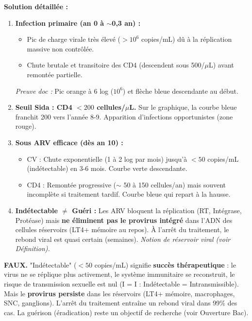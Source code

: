 \documentclass[11pt]{article}
\begin{document}
\begin{exoresolu}
\tcblower
\textbf{Solution détaillée :}
\begin{enumerate}
\item \textbf{Infection primaire (an 0 à $\sim$0,3 an) :} 
    \begin{itemize}
    \item Pic de charge virale très élevé ($> 10^6$ copies/mL) dû à la réplication massive non contrôlée.
    \item Chute brutale et transitoire des CD4 (descendent sous 500/$\mu$L) avant remontée partielle.
    \end{itemize}
    \textit{Preuve doc :} Pic orange à 6 log ($10^6$) et flèche bleue descendante au début.
\item \textbf{Seuil Sida : CD4 $< 200$ cellules/$\mu$L.} Sur le graphique, la courbe bleue franchit 200 vers l'année 8-9. Apparition d'infections opportunistes (zone rouge).
\item \textbf{Sous ARV efficace (dès an 10) :}
    \begin{itemize}
    \item CV : Chute exponentielle (1 à 2 log par mois) jusqu'à $< 50$ copies/mL (indétectable) en 3-6 mois. Courbe verte descendante.
    \item CD4 : Remontée progressive ($\sim$ 50 à 150 cellules/an) mais souvent incomplète si traitement tardif. Courbe bleue qui repart à la hausse.
    \end{itemize}
\item \textbf{Indétectable $\neq$ Guéri :} Les ARV bloquent la réplication (RT, Intégrase, Protéase) mais \textbf{ne éliminent pas le provirus intégré} dans l'ADN des cellules réservoirs (LT4+ mémoire au repos). À l'arrêt du traitement, le rebond viral est quasi certain (semaines). \textit{Notion de réservoir viral (voir Définition).}
\end{enumerate}
\end{exoresolu}

\begin{attention}[Piège BEPC : "Charge virale indétectable = Guérison" ?]
\textbf{FAUX.} "Indétectable" ($< 50$ copies/mL) signifie \textbf{succès thérapeutique} : le virus ne se réplique plus activement, le système immunitaire se reconstruit, le risque de transmission sexuelle est nul (I = I : Indétectable = Intransmissible). Mais le \textbf{provirus persiste} dans les réservoirs (LT4+ mémoire, macrophages, SNC, ganglions). L'arrêt du traitement entraîne un rebond viral dans 99\% des cas. La guérison (éradication) reste un objectif de recherche (voir Ouverture Bac).
\end{attention}
\end{document}
